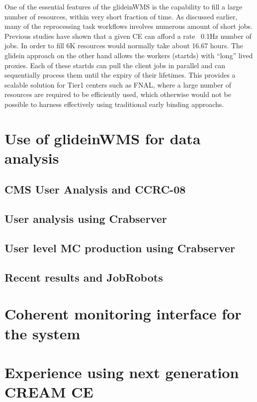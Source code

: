 \documentclass[a4paper]{jpconf}
\begin{document}
One of the essential features of the glideinWMS is the capability to fill a large number of
resources, within very short fraction of time. As discussed earlier, many of the reprocessing task 
workflows involves numerous amount of short jobs. Previous studies have shown that a given CE can 
afford a rate ~0.1Hz number of jobs. In order to fill 6K resources would normally take about 16.67 hours. 
The glidein approach on the other hand allows the workers (startds) with ``long'' lived proxies. 
Each of these startds can pull the client jobs in parallel and can sequentially process them until 
the expiry of their lifetimes. This provides a scalable solution for Tier1 centers such as FNAL, 
where a large number of resources are required to be efficiently used, which otherwise would not 
be possible to harness effectively using traditional early binding approachs.
\section{Use of glideinWMS for data analysis}



\subsection{CMS User Analysis and CCRC-08}



\subsection{User analysis using Crabserver}



\subsection{User level MC production using Crabserver}



\subsection{Recent results and JobRobots}



\section{Coherent monitoring interface for the system}



\section{Experience using next generation CREAM CE}
\end{document}
